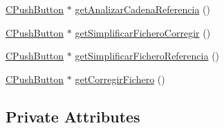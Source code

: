\begin{DoxyCompactItemize}
\hyperlink{classCPushButton}{C\+Push\+Button} $\ast$ \hyperlink{classCPanelOpciones_a964718198c0407260b17d3093281abfc}{get\+Analizar\+Cadena\+Referencia} ()
\item 
\hyperlink{classCPushButton}{C\+Push\+Button} $\ast$ \hyperlink{classCPanelOpciones_af49498f0a1b3e509fb9c5a80eb5410b0}{get\+Simplificar\+Fichero\+Corregir} ()
\item 
\hyperlink{classCPushButton}{C\+Push\+Button} $\ast$ \hyperlink{classCPanelOpciones_a79313d339838378fb036d01a67dd758f}{get\+Simplificar\+Fichero\+Referencia} ()
\item 
\hyperlink{classCPushButton}{C\+Push\+Button} $\ast$ \hyperlink{classCPanelOpciones_a713b74a9380f0eebb6f5287c95aafbba}{get\+Corregir\+Fichero} ()
\end{DoxyCompactItemize}
\subsection*{Private Attributes}
